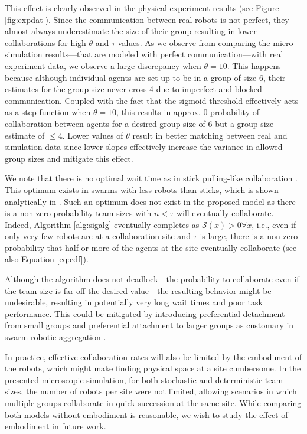 \documentclass{TeXstyles/DARS/svmult}  %
\newcommand{\sig}{\mathcal{S}}
\begin{document}
This effect is clearly observed in the physical experiment results (see Figure \ref{fig:expdat}). Since the communication between real robots is not perfect, they almost always  underestimate the size of their group resulting in lower collaborations for high $\theta$ and $\tau$ values. As we observe from comparing the micro simulation results---that are modeled with perfect communication---with real experiment data, we observe a large discrepancy when $\theta = 10$. This happens because although individual agents are set up to be in a group of size 6, their estimates for the group size never cross 4 due to imperfect and blocked communication. Coupled with the fact that the sigmoid threshold effectively acts as a step function when $\theta = 10$, this results in approx. 0 probability of collaboration between agents for a desired group size of 6 but a group size estimate of $\leq 4$. Lower values of $\theta$ result in better matching between real and simulation data since lower slopes effectively increase the variance in allowed group sizes and mitigate this effect.

We note that there is no optimal wait time as in stick pulling-like collaboration \cite{Lerman2001}. This optimum exists in swarms with less robots than sticks, which is shown analytically in \cite{Martinoli2004}. Such an optimum does not exist in the proposed model as there is a non-zero probability team sizes with $n<\tau$ will eventually collaborate. Indeed, Algorithm \ref{alg:sigalg} eventually completes as $\sig(x) > 0 \forall x$, i.e., even if only very few robots are at a collaboration site and $\tau$ is large, there is a non-zero probability that half or more of the agents at the site eventually collaborate (see also Equation \ref{eq:cdf}).

Although the algorithm does not deadlock---the probability to collaborate even if the team size is far off the desired value---the resulting behavior might be undesirable, resulting in potentially very long wait times and poor task performance. This could be mitigated by introducing preferential detachment from small groups and preferential attachment to larger groups as customary in swarm robotic aggregation \cite{correll2011modeling}.

In practice, effective collaboration rates will also be limited by the embodiment of the robots, which might make finding physical space at a site cumbersome. In the presented microscopic simulation, for both stochastic and deterministic team sizes, the number of robots per site were not limited, allowing scenarios in which multiple groups collaborate in quick succession at the same site. While comparing both models without embodiment is reasonable, we wish to study the effect of embodiment in future work.
\end{document}
